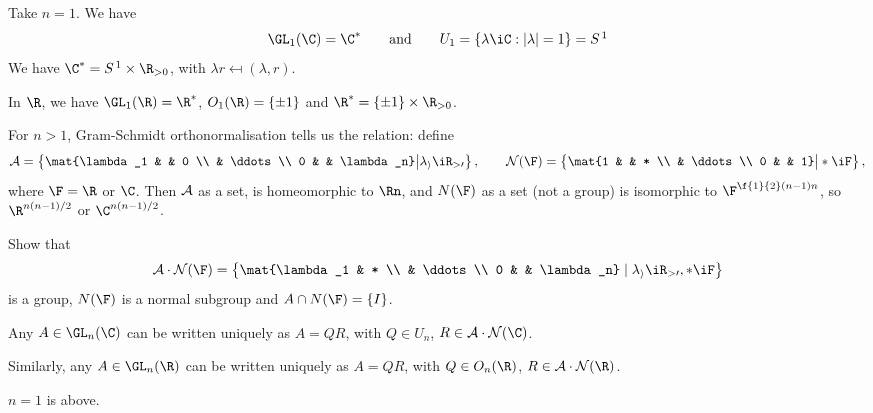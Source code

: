 \begin{example}
	Take $n=1$. We have
	\begin{equation*}
		\textstyle\GL_1(\C)=\C^*
		\qquad \text{and} \qquad
		U_1=\left\{\lambda\iC : \left\vert \lambda \right\vert=1 \right\} = S^{\,1}
	\end{equation*}
	We have $\C^* = S^{\,1}\times \R_{>0}$, with $\lambda r\mapsfrom (\lambda,r)$.
	
	In $\R$, we have $\GL_1(\R) = \R^*$, $O_1(\R)=\left\{\pm 1\right\}$ and $\R^* = \left\{\pm 1\right\} \times \R_{>0}$. %
	
	For $n>1$, Gram-Schmidt orthonormalisation tells us the relation: define
	\begin{equation*}
		\cal{A} = \left\{\mat{\lambda_1 & & 0 \\ & \ddots \\ 0 & & \lambda_n} \big|
		\lambda_i\iR_{>0}\right\},
		\qquad
		N(\F) = \left\{\mat{1 & & * \\ & \ddots \\ 0 & & 1} \big| *\iF\right\},
	\end{equation*}
	where $\F=\R$ or $\C$. Then $\cal{A}$ as a set, is homeomorphic to $\Rn$, and $N(\F)$ as a set (not a group) is isomorphic to $\F^{\f{1}{2}\left( n-1 \right)n}$, so $\R^{n(n-1)/2}$ or $\C^{n(n-1)/2}$.
\end{example}

\begin{exercise}
	Show that
	\begin{equation*}
		\cal{A}\cdot N(\F) = \left\{\mat{\lambda_1 & * \\ & \ddots \\ 0 & & \lambda_n} \mid \lambda_i\iR_{>0}, *\iF\right\} %
	\end{equation*}
	is a group, $N(\F)$ is a normal subgroup and $A\cap N(\F)=\{I\}$. %
\end{exercise}

\begin{theorem}
	Any $A\in\GL_n(\C)$ can be written uniquely as $A=QR$, with $Q\in U_n$, $R\in \cal{A}\cdot N(\C)$. %
	
	Similarly, any $A\in\GL_n(\R)$ can be written uniquely as $A=QR$, with $Q\in O_n(\R)$, $R\in\cal{A}\cdot N(\R)$. %
\end{theorem}

\begin{example}
	$n=1$ is above. %
\end{example}

